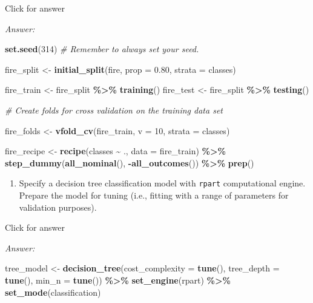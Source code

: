 \documentclass[
]{book}
\newenvironment{Shaded}{\begin{snugshade}}{\end{snugshade}}
\newcommand{\AttributeTok}[1]{\textcolor[rgb]{0.13,0.29,0.53}{#1}}
\newcommand{\CommentTok}[1]{\textcolor[rgb]{0.56,0.35,0.01}{\textit{#1}}}
\newcommand{\DecValTok}[1]{\textcolor[rgb]{0.00,0.00,0.81}{#1}}
\newcommand{\FloatTok}[1]{\textcolor[rgb]{0.00,0.00,0.81}{#1}}
\newcommand{\FunctionTok}[1]{\textcolor[rgb]{0.13,0.29,0.53}{\textbf{#1}}}
\newcommand{\NormalTok}[1]{#1}
\newcommand{\OtherTok}[1]{\textcolor[rgb]{0.56,0.35,0.01}{#1}}
\newcommand{\SpecialCharTok}[1]{\textcolor[rgb]{0.81,0.36,0.00}{\textbf{#1}}}
\newcommand{\StringTok}[1]{\textcolor[rgb]{0.31,0.60,0.02}{#1}}
\providecommand{\tightlist}{%
  \setlength{\itemsep}{0pt}\setlength{\parskip}{0pt}}
\begin{document}
Click for answer

\emph{Answer:}

\begin{Shaded}
\begin{Highlighting}[]
\FunctionTok{set.seed}\NormalTok{(}\DecValTok{314}\NormalTok{) }\CommentTok{\# Remember to always set your seed.}

\NormalTok{fire\_split }\OtherTok{\textless{}{-}} \FunctionTok{initial\_split}\NormalTok{(fire, }\AttributeTok{prop =} \FloatTok{0.80}\NormalTok{,  }\AttributeTok{strata =}\NormalTok{ classes)}

\NormalTok{fire\_train }\OtherTok{\textless{}{-}}\NormalTok{ fire\_split }\SpecialCharTok{\%\textgreater{}\%} \FunctionTok{training}\NormalTok{()}
\NormalTok{fire\_test }\OtherTok{\textless{}{-}}\NormalTok{ fire\_split }\SpecialCharTok{\%\textgreater{}\%} \FunctionTok{testing}\NormalTok{()}

\CommentTok{\# Create folds for cross validation on the training data set}

\NormalTok{fire\_folds }\OtherTok{\textless{}{-}} \FunctionTok{vfold\_cv}\NormalTok{(fire\_train, }\AttributeTok{v =} \DecValTok{10}\NormalTok{, }\AttributeTok{strata =}\NormalTok{ classes)}

\NormalTok{fire\_recipe }\OtherTok{\textless{}{-}} \FunctionTok{recipe}\NormalTok{(classes }\SpecialCharTok{\textasciitilde{}}\NormalTok{ ., }\AttributeTok{data =}\NormalTok{ fire\_train) }\SpecialCharTok{\%\textgreater{}\%}
 \FunctionTok{step\_dummy}\NormalTok{(}\FunctionTok{all\_nominal}\NormalTok{(), }\SpecialCharTok{{-}}\FunctionTok{all\_outcomes}\NormalTok{()) }\SpecialCharTok{\%\textgreater{}\%}
 \FunctionTok{prep}\NormalTok{()}
\end{Highlighting}
\end{Shaded}

\begin{enumerate}
\def\labelenumi{\alph{enumi}.}
\setcounter{enumi}{1}
\tightlist
\item
  Specify a decision tree classification model with \texttt{rpart} computational engine. Prepare the model for tuning (i.e., fitting with a range of parameters for validation purposes).
\end{enumerate}

Click for answer

\emph{Answer:}

\begin{Shaded}
\begin{Highlighting}[]
\NormalTok{tree\_model }\OtherTok{\textless{}{-}} \FunctionTok{decision\_tree}\NormalTok{(}\AttributeTok{cost\_complexity =} \FunctionTok{tune}\NormalTok{(),}
                            \AttributeTok{tree\_depth =} \FunctionTok{tune}\NormalTok{(),}
                            \AttributeTok{min\_n =} \FunctionTok{tune}\NormalTok{()) }\SpecialCharTok{\%\textgreater{}\%} 
              \FunctionTok{set\_engine}\NormalTok{(}\StringTok{\textquotesingle{}rpart\textquotesingle{}}\NormalTok{) }\SpecialCharTok{\%\textgreater{}\%} 
              \FunctionTok{set\_mode}\NormalTok{(}\StringTok{\textquotesingle{}classification\textquotesingle{}}\NormalTok{)}
\end{Highlighting}
\end{Shaded}
\end{document}
